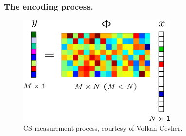 \documentclass[xcolor=dvipsnames,10pt]{beamer}
\begin{document}
\begin{frame}
\frametitle{The encoding process.} %

\begin{figure}[h]
        \centering
        \includegraphics[width = 8cm]{csss}
        \caption{CS measurement process, courtesy of Volkan Cevher.}
      \end{figure}


\end{frame}
\end{document}
